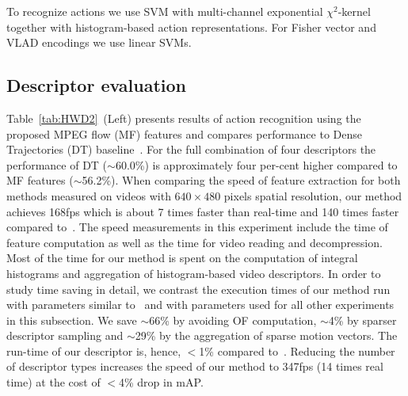 \documentclass[10pt,twocolumn,letterpaper]{article}
\begin{document}

To recognize actions we use SVM with multi-channel exponential $\chi^2$-kernel~\cite{Zhang07} together with histogram-based action representations. For Fisher vector and VLAD encodings we use linear SVMs.


\subsection{Descriptor evaluation}

Table~\ref{tab:HWD2}~(Left) presents results of action recognition using the proposed MPEG flow (MF) features %
and compares performance to Dense Trajectories (DT) baseline~\cite{Wang12}. For the full combination of four descriptors the performance of DT ($\sim$60.0\%) is approximately four per-cent higher compared to MF features ($\sim$56.2\%). When comparing the speed of feature extraction for both methods measured on videos with $640\times480$ pixels spatial resolution, our method achieves 168fps which is about 7 times faster than real-time and 140 times faster compared to~\cite{Wang12}. The speed measurements in this experiment include the time of feature computation as well as the time for video reading and decompression. Most of the time for our method is spent on the computation of integral histograms and aggregation of histogram-based video descriptors. In order to  study time saving in detail, we contrast the execution times of our method run with parameters similar to~\cite{Wang12} and with parameters used for all other experiments in this subsection. We save $\sim$66\% by avoiding OF computation, $\sim$4\% by sparser descriptor sampling and $\sim$29\% by the aggregation of sparse motion vectors. The run-time of our descriptor is, hence, $<$1\% compared to~\cite{Wang12}. Reducing the number of descriptor types increases the speed of our method to 347fps (14 times real time) at the cost of $<$4\% drop in mAP. 
\end{document}
